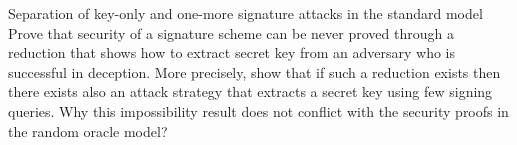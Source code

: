 \documentclass{crypto-exercise}
\author{Sven Laur}
\begin{document}
\begin{exercise}{Separation of key-only and one-more signature attacks in the standard model}
Prove that security of a signature scheme can be
  never proved through a reduction that shows how to extract secret
  key from an adversary who is successful in deception. More
  precisely, show that if such a reduction exists then there exists
  also an attack strategy that extracts a secret key using few signing
  queries. Why this impossibility result does not conflict with the
  security proofs in the random oracle model?
\end{exercise}
\begin{solution}
\end{solution}
\end{document}
